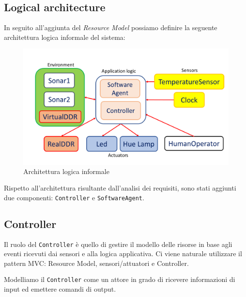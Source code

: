 \documentclass{../llncs}
\newcommand{\labelfig}[1]{\label{fig:#1}}
\begin{document}


\subsection{Logical architecture}

In seguito all'aggiunta del \emph{Resource Model} possiamo definire la seguente architettura logica informale del sistema:

\begin{figure}[!htb]
\centering
\includegraphics[scale=0.4]{img/informalLogicalArchitecture.png}
\caption{Architettura logica informale}\labelfig{informalLA}
\end{figure}

Rispetto all'architettura risultante dall'analisi dei requisiti, sono stati aggiunti due componenti: \texttt{Controller} e \texttt{SoftwareAgent}. 

\subsection{Controller}
Il ruolo del \texttt{Controller} è quello di gestire il modello delle risorse in base agli eventi ricevuti dai sensori e alla logica applicativa. Ci viene naturale utilizzare il pattern MVC: Resource Model, sensori/attuatori e Controller.

Modelliamo il \texttt{Controller} come un attore in grado di ricevere informazioni di input ed emettere comandi di output.


\end{document}
